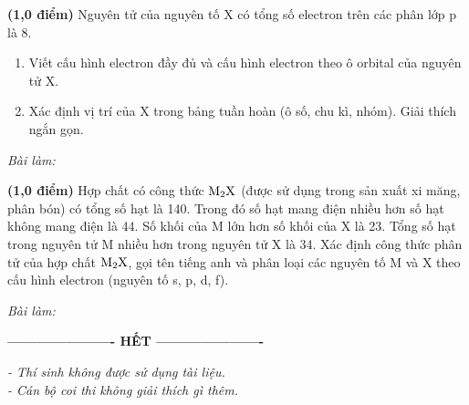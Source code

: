 \documentclass[11pt,a4paper]{article}
\begin{document}
\begin{ex}%
\textbf{(1,0 điểm)} Nguyên tử của nguyên tố X có tổng số electron trên các phân lớp p là 8.
\begin{enumerate}[label=\textbf{\alph*)}]
\item Viết cấu hình electron đầy đủ và cấu hình electron theo ô orbital của nguyên tử X.
\item Xác định vị trí của X trong bảng tuần hoàn (ô số, chu kì, nhóm). Giải thích ngắn gọn.
\end{enumerate}

\noindent\textit{Bài làm:}

\end{ex}

\begin{ex}%
\textbf{(1,0 điểm)} Hợp chất có công thức $\ce{M2X}$ (được sử dụng trong sản xuất xi măng, phân bón) có tổng số hạt là 140. Trong đó số hạt mang điện nhiều hơn số hạt không mang điện là 44. Số khối của M lớn hơn số khối của X là 23. Tổng số hạt trong nguyên tử M nhiều hơn trong nguyên tử X là 34. Xác định công thức phân tử của hợp chất $\ce{M2X}$, gọi tên tiếng anh và phân loại các nguyên tố M và X theo cấu hình electron (nguyên tố s, p, d, f).

\noindent\textit{Bài làm:}

\end{ex}

\vspace{8pt}
\begin{center}
\textbf{---------------------- HẾT ----------------------}
\end{center}
\begin{center}
\textit{\small - Thí sinh không được sử dụng tài liệu.\\ - Cán bộ coi thi không giải thích gì thêm.}
\end{center}
\end{document}
